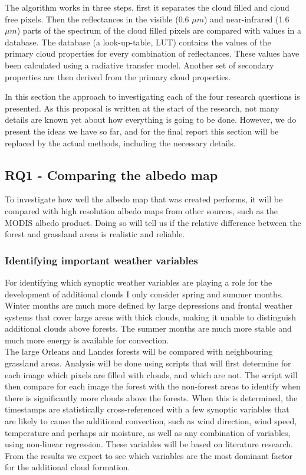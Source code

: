 \documentclass{article}
\begin{document}
The algorithm works in three steps, first it separates the cloud filled and cloud free pixels. Then the reflectances in the visible (0.6 $\mu m$) and near-infrared (1.6 $\mu m$) parts of the spectrum of the cloud filled pixels are compared with values in a database. The database (a look-up-table, LUT) contains the values of the primary cloud properties for every combination of reflectances. These values have been calculated using a radiative transfer model. Another set of secondary properties are then derived from the primary cloud properties.


In this section the approach to investigating each of the four research questions is presented. As this proposal is written at the start of the research, not many details are known yet about how everything is going to be done. However, we do present the ideas we have so far, and for the final report this section will be replaced by the actual methods, including the necessary details.

\subsection{RQ1 - Comparing the albedo map}
To investigate how well the albedo map that was created performs, it will be compared with high resolution albedo maps from other sources, such as the MODIS albedo product. Doing so will tell us if the relative difference between the forest and grassland areas is realistic and reliable.


\subsubsection{Identifying important weather variables}
For identifying which synoptic weather variables are playing a role for the development of additional clouds I only consider spring and summer months. Winter months are much more defined by large depressions and frontal weather systems that cover large areas with thick clouds, making it unable to distinguish additional clouds above forests. The summer months are much more stable and much more energy is available for convection.\\

The large Orleans and Landes forests will be compared with neighbouring grassland areas. Analysis will be done using scripts that will first determine for each image which pixels are filled with clouds, and which are not. The script will then compare for each image the forest with the non-forest areas to identify when there is significantly more clouds above the forests. When this is determined, the timestamps are statistically cross-referenced with a few synoptic variables that are likely to cause the additional convection, such as wind direction, wind speed, temperature and perhaps air moisture, as well as any combination of variables, using non-linear regression. These variables will be based on literature research. From the results we expect to see which variables are the most dominant factor for the additional cloud formation.
\end{document}
